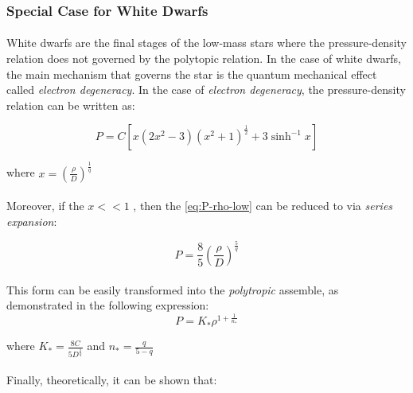 \documentclass[letterpaper,12pt]{article}
\begin{document}
\subsubsection{Special Case for White Dwarfs}

\paragraph{} White dwarfs are the final stages of the low-mass stars where the pressure-density relation does not governed by the polytopic relation. In the case of white dwarfs, the main mechanism that governs the star is the quantum mechanical effect called \textit{electron degeneracy}. In the case of \textit{electron degeneracy}, the pressure-density relation can be written as:

\begin{equation}
    \label{eq:P-rho-low}
    P = C \left[x \left(2x^2-3\right)\left(x^2+1\right)^{\frac{1}{2}}+3\sinh^{-1}{x}\right]
\end{equation}

where $x = \left(\frac{\rho}{D}\right)^{\frac{1}{q}}$

\paragraph{} Moreover, if the $x<<1$ , then the \eqref{eq:P-rho-low} can be reduced to via \textit{series expansion}:

\begin{equation*}
    P = \frac{8}{5} \left(\frac{\rho}{D}\right)^{\frac{5}{q}}
\end{equation*}

\paragraph{} This form can be easily transformed into the \textit{polytropic} assemble, as demonstrated in the following expression:
\begin{equation}
    \label{eq:P-rho-low-reduced}
    P = K_* \rho^{1 + \frac{1}{n_*}}
\end{equation}

where $K_* = \frac{8C}{5D^{\frac{5}{q}}}$ and $n_* = \frac{q}{5-q}$

\paragraph{} Finally, theoretically, it can be shown that:
\end{document}
